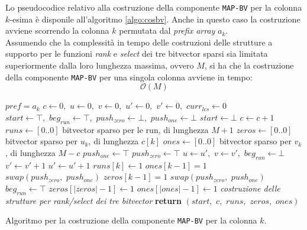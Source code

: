Lo pseudocodice relativo alla costruzione della componente \texttt{MAP-BV} per
la colonna $k$-esima è disponile all'algoritmo \ref{algo:cosbv}. Anche in questo
caso la costruzione avviene scorrendo la colonna $k$ permutata dal
\textit{prefix array} $a_k$. \\ 
Assumendo che la complessità in tempo delle costruzioni delle
strutture a supporto per le funzioni \textit{rank} e \textit{select} dei tre
bitvector sparsi sia limitata superiormente dalla loro lunghezza massima, ovvero
$M$, si ha che la costruzione della componente \texttt{MAP-BV} per una singola
colonna avviene in tempo:
\begin{equation}
  \label{eq:bvcos}
  \mathcal{O}(M)
\end{equation}
\begin{algorithm}
  \small
  \begin{algorithmic}[1]
    \Comment $pref=a_k$
    \State $c\gets 0,\,\,u\gets 0,\,\,v\gets 0,\,\,u'\gets 0,\,\, v'\gets
    0,\,\,curr_{lcs}\gets 0$
    \State $start \gets \top,\,\,beg_{run}\gets \top,\,\,push_{zero}\gets
    \bot,\,\,push_{one}\gets \bot$
    \For {\textit{every} $k\in\left[0,\,\, M\right)$}
    \State $start \gets \bot$
    \EndIf
    \State $c\gets c+1$
    \EndIf
    \EndFor
    \State $runs\gets[0..0]$
    \Comment bitvector sparso per le run, di lunghezza $M+1$
    \State $zeros\gets[0..0]$
    \Comment bitvector sparso per $u_k$, di lunghezza $c[k]$
    \State $ones\gets[0..0]$
    \Comment bitvector sparso per $v_k$, di lunghezza $M-c$
    \State $push_{one}\gets \top$
    \Else
    \State $push_{zero}\gets \top$
    \EndIf
    \For {\textit{every} $k\in\left[0,\,\, M\right)$}
    \State $u\gets u',\,\,v\gets v',\,\,beg_{run}\gets \bot$
    \EndIf
    \State $v'\gets v'+1$
    \Else
    \State $u'\gets u'+1$
    \EndIf
    \State $runs[k]\gets 1$
    \State $ones[k-1]=1$
    \EndIf
    \State $swap(push_{zero},\,\,push_{one})$
    \Else
    \State $zeros[k-1]=1$
    \EndIf
    \State $swap(push_{zero},\,\,push_{one})$
    \EndIf
    \State $beg_{run}\gets \top$
    \EndIf
    \EndFor
    \State $zeros[|zeros|-1]\gets 1$
    \EndIf
    \State $ones[|ones|-1]\gets 1$
    \EndIf
    \State \textit{costruzione delle strutture per rank/select dei tre
    bitvector} 
    \State \textbf{return}
    $(start,\,\,c,\,\,runs,\,\,zeros,\,\,ones)$  
    \EndFunction
  \end{algorithmic}
  \caption{\footnotesize{Algoritmo per la costruzione della componente
  \texttt{MAP-BV} per la colonna $k$.}}
  \label{algo:cosbv}
\end{algorithm}
